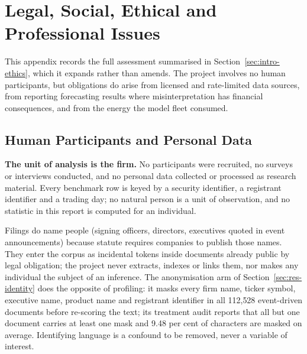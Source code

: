 \chapter{Legal, Social, Ethical and Professional Issues}
\label{app:ethics}

This appendix records the full assessment summarised in Section~\ref{sec:intro-ethics}, which it expands rather than amends. The project involves no human participants, but obligations do arise from licensed and rate-limited data sources, from reporting forecasting results where misinterpretation has financial consequences, and from the energy the model fleet consumed.

\section{Human Participants and Personal Data}

\textbf{The unit of analysis is the firm.} No participants were recruited, no surveys or interviews conducted, and no personal data collected or processed as research material. Every benchmark row is keyed by a security identifier, a registrant identifier and a trading day; no natural person is a unit of observation, and no statistic in this report is computed for an individual.

Filings do name people (signing officers, directors, executives quoted in event announcements) because statute requires companies to publish those names. They enter the corpus as incidental tokens inside documents already public by legal obligation; the project never extracts, indexes or links them, nor makes any individual the subject of an inference. The anonymisation arm of Section~\ref{sec:res-identity} does the opposite of profiling: it masks every firm name, ticker symbol, executive name, product name and registrant identifier in all 112{,}528 event-driven documents before re-scoring the text; its treatment audit reports that all but one document carries at least one mask and 9.48 per cent of characters are masked on average. %
Identifying language is a confound to be removed, never a variable of interest.

